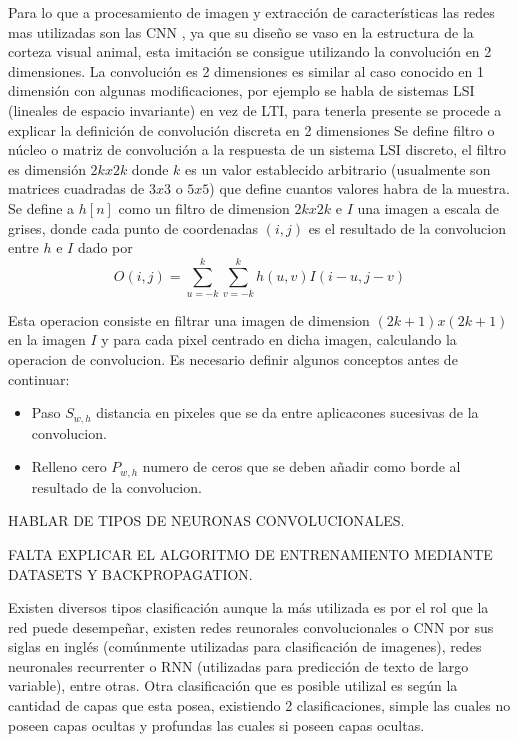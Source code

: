 Para lo que a procesamiento de imagen y extracción de características las redes mas utilizadas son las CNN , ya que su diseño se vaso en la estructura de la corteza visual animal, esta imitación se consigue utilizando la convolución en 2 dimensiones.
La convolución es 2 dimensiones es similar al caso conocido en  1 dimensión con algunas modificaciones, por ejemplo se habla de sistemas LSI (lineales de espacio invariante) en vez de LTI, para tenerla presente se procede a explicar la definición de convolución discreta en 2 dimensiones
Se define filtro o núcleo  o matriz de convolución a la respuesta de un sistema LSI discreto, el filtro es dimensión $2k x 2k$ donde $k$ es un valor establecido arbitrario (usualmente son matrices cuadradas de $3x3$ o $5x5$) que define cuantos valores habra de la muestra.
Se define a $h[n]$ como un filtro de dimension $2k x 2k$ e $I$ una imagen a escala de grises, donde cada punto de coordenadas $(i,j)$ es el resultado de la convolucion entre $h$ e $I$ dado por 
\begin{equation}
O(i,j)= \sum_{u=-k}^{k} \sum_{v=-k}^{k} h(u,v)I(i-u,j-v)
\end{equation}
 
Esta operacion consiste en filtrar una imagen de dimension $(2k+1)x(2k+1)$ en la imagen $I$ y para cada pixel centrado en dicha imagen, calculando la operacion de convolucion.
Es necesario definir algunos conceptos antes de continuar:
\begin{itemize}
\item Paso $S_{w,h}$ distancia en pixeles que se da entre aplicacones sucesivas de la convolucion.
\item Relleno cero $P_{w,h}$ numero de ceros que se deben añadir como borde al resultado de la convolucion.
\end{itemize}
HABLAR DE TIPOS DE NEURONAS CONVOLUCIONALES.

FALTA EXPLICAR EL ALGORITMO DE ENTRENAMIENTO MEDIANTE DATASETS Y BACKPROPAGATION.

Existen diversos tipos clasificación aunque la más utilizada es por el rol que la red puede desempeñar, existen redes reunorales convolucionales o CNN por sus siglas en inglés (comúnmente utilizadas para clasificación de imagenes),
redes neuronales recurrenter o RNN (utilizadas para predicción de texto de largo variable), entre otras. Otra clasificación que es posible utilizal es según la cantidad de capas que esta posea, existiendo 2 clasificaciones, simple las cuales no poseen capas ocultas y profundas las cuales si poseen capas ocultas.

